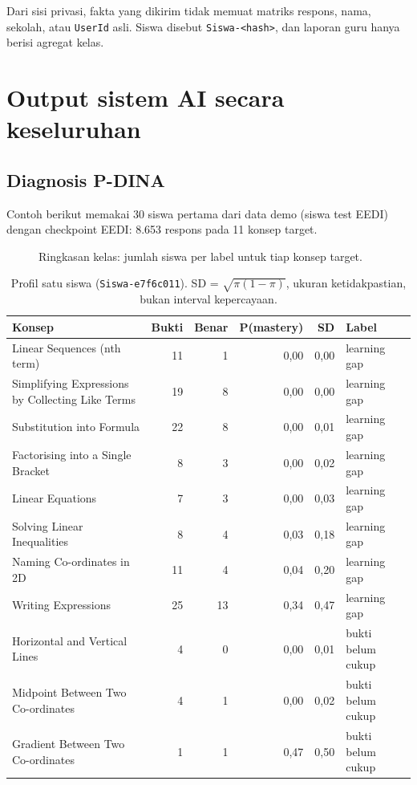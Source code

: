 \documentclass[11pt,a4paper]{article}
\begin{document}
Dari sisi privasi, fakta yang dikirim tidak memuat matriks respons, nama, sekolah, atau \texttt{UserId} asli. Siswa
disebut \texttt{Siswa-<hash>}, dan laporan guru hanya berisi agregat kelas.

\section{Output sistem AI secara keseluruhan}

\subsection{Diagnosis P-DINA}

Contoh berikut memakai 30 siswa pertama dari data demo (siswa test EEDI) dengan checkpoint EEDI: 8.653 respons pada
11 konsep target.

\begin{figure}[h]
  \centering
  \setlength\figH{5.6cm}
  \begin{minipage}{0.75\linewidth}\end{minipage}
  \caption{Ringkasan kelas: jumlah siswa per label untuk tiap konsep target.}
\end{figure}

\begin{table}[h]
  \centering\footnotesize\setlength\tabcolsep{5pt}
  \begin{tabular}{@{}lrrrrl@{}}
    \toprule
    Konsep & Bukti & Benar & P(mastery) & SD & Label \\
    \midrule
    Linear Sequences (nth term) & 11 & 1 & 0,00 & 0,00 & learning gap \\
    Simplifying Expressions by Collecting Like Terms & 19 & 8 & 0,00 & 0,00 & learning gap \\
    Substitution into Formula & 22 & 8 & 0,00 & 0,01 & learning gap \\
    Factorising into a Single Bracket & 8 & 3 & 0,00 & 0,02 & learning gap \\
    Linear Equations & 7 & 3 & 0,00 & 0,03 & learning gap \\
    Solving Linear Inequalities & 8 & 4 & 0,03 & 0,18 & learning gap \\
    Naming Co-ordinates in 2D & 11 & 4 & 0,04 & 0,20 & learning gap \\
    Writing Expressions & 25 & 13 & 0,34 & 0,47 & learning gap \\
    Horizontal and Vertical Lines & 4 & 0 & 0,00 & 0,01 & bukti belum cukup \\
    Midpoint Between Two Co-ordinates & 4 & 1 & 0,00 & 0,02 & bukti belum cukup \\
    Gradient Between Two Co-ordinates & 1 & 1 & 0,47 & 0,50 & bukti belum cukup \\
    \bottomrule
  \end{tabular}
  \caption{Profil satu siswa (\texttt{Siswa-e7f6c011}). SD = $\sqrt{\pi(1-\pi)}$, ukuran ketidakpastian, bukan
  interval kepercayaan.}
\end{table}
\end{document}
